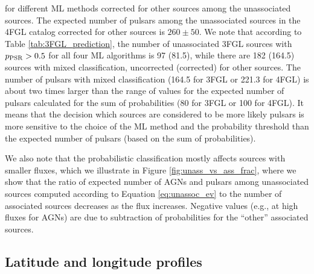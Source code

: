 for different ML methods corrected for other sources among the unassociated sources.
The expected number of pulsars among the unassociated sources in the 4FGL catalog corrected for other sources is $260 \pm 50$.
We note that according to Table \ref{tab:3FGL_prediction}, the number of unassociated 3FGL sources 
with $p_{\rm PSR} > 0.5$ for all four ML algorithms is 97 (81.5), while there are 182 (164.5) sources with mixed classification,
uncorrected (corrected) for other sources.
The number of pulsars with mixed classification (164.5 for 3FGL or 221.3 for 4FGL)
is about two times larger than the range of values for the expected number of pulsars calculated for the sum of probabilities 
(80 for 3FGL or 100 for 4FGL).
It means that the decision which sources are considered to be more likely pulsars is more sensitive to the choice of the ML method
and the probability threshold than the expected number of pulsars (based on the sum of probabilities).

We also note that the probabilistic classification mostly affects sources with smaller fluxes,
which we illustrate in Figure \ref{fig:unass_vs_ass_frac}, where we show that the ratio of expected number of AGNs and pulsars among unassociated sources computed according to Equation \ref{eq:unassoc_ev} to the number of associated sources decreases as the flux increases.
Negative values (e.g., at high fluxes for AGNs) are due to subtraction of probabilities for the ``other'' associated sources.


\subsection{Latitude and longitude profiles}

